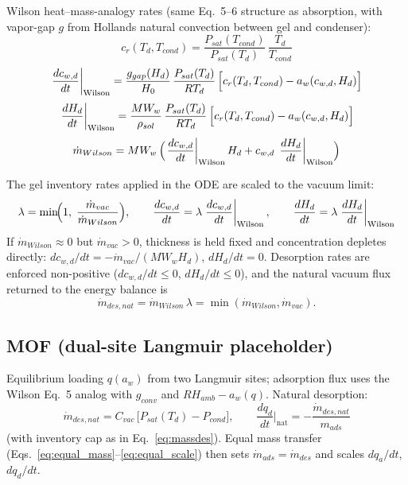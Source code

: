 \documentclass[11pt]{article}
\begin{document}
Wilson heat--mass-analogy rates (same Eq.~5--6 structure as absorption, with vapor-gap $g$ from Hollands natural convection between gel and condenser):
\begin{equation}
c_r(T_d, T_{cond}) = \frac{P_{sat}(T_{cond})}{P_{sat}(T_d)}\,\frac{T_d}{T_{cond}}
\label{eq:crdes}
\end{equation}
\begin{equation}
\left.\frac{dc_{w,d}}{dt}\right|_{\mathrm{Wilson}}
= \frac{g_{gap}(H_d)}{H_0}\,\frac{P_{sat}(T_d)}{RT_d}\,
\Bigl[c_r(T_d, T_{cond}) - a_w(c_{w,d}, H_d)\Bigr]
\label{eq:massdes_cw}
\end{equation}
\begin{equation}
\left.\frac{dH_d}{dt}\right|_{\mathrm{Wilson}}
= \frac{MW_w}{\rho_{sol}}\,\frac{P_{sat}(T_d)}{RT_d}\,
\Bigl[c_r(T_d, T_{cond}) - a_w(c_{w,d}, H_d)\Bigr]
\label{eq:massdes_H}
\end{equation}
\begin{equation}
\dot{m}_{Wilson} = MW_w\,\Bigl(
\left.\frac{dc_{w,d}}{dt}\right|_{\mathrm{Wilson}} H_d
+ c_{w,d}\,\left.\frac{dH_d}{dt}\right|_{\mathrm{Wilson}}\Bigr)
\label{eq:mwilson}
\end{equation}

The gel inventory rates applied in the ODE are scaled to the vacuum limit:
\begin{equation}
\lambda = \min\!\Bigl(1,\; \frac{\dot{m}_{vac}}{\dot{m}_{Wilson}}\Bigr),
\qquad
\frac{dc_{w,d}}{dt} = \lambda\left.\frac{dc_{w,d}}{dt}\right|_{\mathrm{Wilson}},
\qquad
\frac{dH_d}{dt} = \lambda\left.\frac{dH_d}{dt}\right|_{\mathrm{Wilson}}
\label{eq:massdes_scale}
\end{equation}
If $\dot{m}_{Wilson} \approx 0$ but $\dot{m}_{vac} > 0$, thickness is held fixed and concentration depletes directly:
$dc_{w,d}/dt = -\dot{m}_{vac}/(MW_w H_d)$, $dH_d/dt = 0$.
Desorption rates are enforced non-positive ($dc_{w,d}/dt \le 0$, $dH_d/dt \le 0$), and the natural vacuum flux returned to the energy balance is
\begin{equation}
\dot{m}_{des,nat} = \dot{m}_{Wilson}\,\lambda = \min(\dot{m}_{Wilson}, \dot{m}_{vac}).
\label{eq:mdesnat}
\end{equation}

\subsection{MOF (dual-site Langmuir placeholder)}

Equilibrium loading $q(a_w)$ from two Langmuir sites; adsorption flux uses the Wilson Eq.~5 analog with $g_{conv}$ and $RH_{amb} - a_w(q)$. Natural desorption:
\begin{equation}
\dot{m}_{des,nat} = C_{vac}\,\bigl[P_{sat}(T_d) - P_{cond}\bigr],
\qquad
\frac{dq_d}{dt}\Big|_{\mathrm{nat}} = -\frac{\dot{m}_{des,nat}}{m_{ads}}
\end{equation}
(with inventory cap as in Eq.~\eqref{eq:massdes}). Equal mass transfer (Eqs.~\eqref{eq:equal_mass}--\eqref{eq:equal_scale}) then sets $\dot{m}_{ads}=\dot{m}_{des}$ and scales $dq_a/dt$, $dq_d/dt$.
\end{document}
